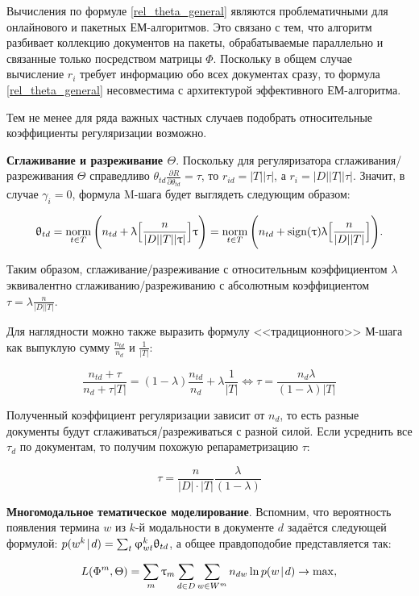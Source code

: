 Вычисления по формуле \eqref{rel_theta_general} являются проблематичными для онлайнового и пакетных ЕМ-алгоритмов. Это связано с тем, что алгоритм разбивает коллекцию документов на пакеты, обрабатываемые параллельно и связанные только посредством матрицы $\Phi$. Поскольку в общем случае вычисление $r_i$ требует информацию обо всех документах сразу, то формула \eqref{rel_theta_general} несовместима с архитектурой эффективного ЕМ-алгоритма.

Тем не менее для ряда важных частных случаев подобрать относительные коэффициенты регуляризации возможно.

\textbf{Сглаживание и разреживание $\Theta$}.  Поскольку для регуляризатора сглаживания/разреживания $\Theta$ справедливо $\theta_{td} \frac{\partial R}{\partial \theta_{td}} = \tau$, то $r_{id} = |T| |\tau|$, а $r_{i} = |D| |T| |\tau|$. Значит, в случае $\gamma_i=0$, формула M-шага будет выглядеть следующим образом:


\[
\uptheta_{td} = \mathop{\mathrm{norm}}\limits_{t \in T} \Bigg(
    n_{td} + \uplambda 
	\Big[
		\frac{n}{|D| |T| |\uptau|}
	\Big]
	\uptau
\Bigg) = 
\mathop{\mathrm{norm}}\limits_{t \in T} \Bigg(
    n_{td} + \textup{sign}(\uptau)\uplambda 
	\Big[
		\frac{n}{|D| |T|}
	\Big]
\Bigg).
\]

Таким образом, сглаживание/разреживание с относительным коэффициентом $\lambda$ эквивалентно сглаживанию/разреживанию с абсолютным коэффициентом $\tau=\lambda \frac{n}{|D||T|}$.

Для наглядности можно также выразить формулу <<традиционного>> М-шага как выпуклую сумму $\frac{n_{td}}{n_d}$ и $\frac{1}{|T|}$:

\[
\frac{n_{td} + \tau}{n_d + \tau |T|} = (1-\lambda) \frac{n_{td}}{n_d} + \lambda \frac{1}{|T|} \iff \tau = \frac{n_d \lambda}{(1-\lambda) |T|} \label{sp_theta_rel2abs}
\]

Полученный коэффициент регуляризации зависит от $n_d$, то есть разные документы будут сглаживаться/разреживаться с разной силой. Если усреднить все $\tau_d$ по документам, то получим похожую репараметризацию $\tau$:

\[
\tau = \frac{n}{|D| \cdot |T|}\frac{\lambda}{(1-\lambda)} \label{sp_theta_rel2abs_avg}
\]

\textbf{Многомодальное тематическое моделирование}. Вспомним, что вероятность появления термина $w$ из $k$-й модальности в документе $d$ задаётся следующей формулой: $p(w^k \mspace{2mu}{|}\mspace{2mu} d) = \sum_t \upvarphi_{wt}^k \uptheta_{td}$, а общее правдоподобие представляется так:

\[
L(\Phi^m, \Theta) = \sum_m \uptau_m \sum_{d\in D} \sum_{w \in W^m} n_{dw} \ln p(w \mspace{2mu}{|}\mspace{2mu} d) \rightarrow \max, \label{modal_likelihood}
\]

